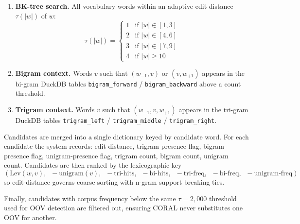 \begin{enumerate}
 \item \textbf{BK-tree search.} All vocabulary words within an adaptive edit distance $\tau(|w|)$ of $w$:
 \[ \tau(|w|) = \begin{cases}
 1 & \text{if } |w| \in [1,3]\\
 2 & \text{if } |w| \in [4,6]\\
 3 & \text{if } |w| \in [7,9]\\
 4 & \text{if } |w| \ge 10
 \end{cases} \]
 \item \textbf{Bigram context.} Words $v$ such that $(w_{-1}, v)$ or $(v, w_{+1})$ appears in the bi-gram DuckDB tables \texttt{bigram\_forward} / \texttt{bigram\_backward} above a count threshold.
 \item \textbf{Trigram context.} Words $v$ such that $(w_{-1}, v, w_{+1})$ appears in the tri-gram DuckDB tables \texttt{trigram\_left} / \texttt{trigram\_middle} / \texttt{trigram\_right}.
\end{enumerate}

Candidates are merged into a single dictionary keyed by candidate word. For each candidate the system records: edit distance, trigram-presence flag, bigram-presence flag, unigram-presence flag, trigram count, bigram count, unigram count. Candidates are then ranked by the lexicographic key
\[ (\text{Lev}(w,v),\;\; -\text{unigram}(v),\;\; -\text{tri-hits},\;\; -\text{bi-hits},\;\; -\text{tri-freq},\;\; -\text{bi-freq},\;\; -\text{unigram-freq}) \]
so edit-distance governs coarse sorting with n-gram support breaking ties.

Finally, candidates with corpus frequency below the same $\tau = 2{,}000$ threshold used for OOV detection are filtered out, ensuring CORAL never substitutes one OOV for another.

